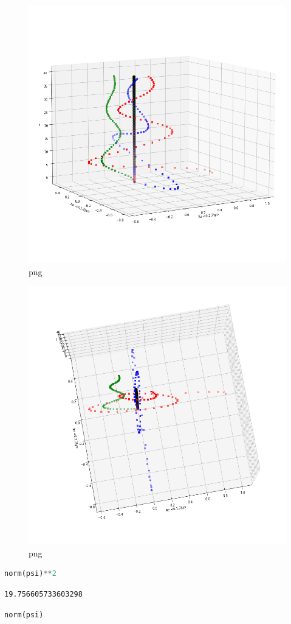 \begin{figure}
\centering
\includegraphics[width=0.666\linewidth]{tex/appendix/nb/jupyter/3lev/output_54_0.png}
\caption{png}
\end{figure}

\begin{figure}
\centering
\includegraphics[width=0.666\linewidth]{tex/appendix/nb/jupyter/3lev/output_54_1.png}
\caption{png}
\end{figure}

\begin{lstlisting}[language=Python]
norm(psi)**2
\end{lstlisting}

\begin{lstlisting}
19.756605733603298
\end{lstlisting}

\begin{lstlisting}[language=Python]
norm(psi)
\end{lstlisting}


